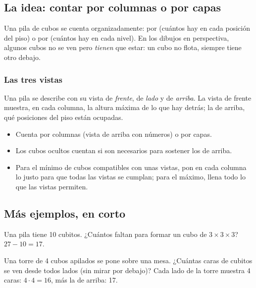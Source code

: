 \bitacora


\subsection{La idea: contar por columnas o por capas}
Una pila de cubos se cuenta organizadamente: por  (cuántos hay en cada posición del piso) o por
 (cuántos hay en cada nivel). En los dibujos en perspectiva, algunos cubos no se ven pero \emph{tienen} que
estar: un cubo no flota, siempre tiene otro debajo.


\subsubsection{Las tres vistas}
Una pila se describe con su vista de \emph{frente}, de \emph{lado} y de \emph{arriba}. La vista de frente muestra, en cada
columna, la altura máxima de lo que hay detrás; la de arriba, qué posiciones del piso están ocupadas.

\begin{regla}
\begin{itemize}
  \item Cuenta por columnas (vista de arriba con números) o por capas.
  \item Los cubos ocultos cuentan si son necesarios para sostener los de arriba.
  \item Para el mínimo de cubos compatibles con unas vistas, pon en cada columna lo justo para que todas las vistas se
  cumplan; para el máximo, llena todo lo que las vistas permiten.
\end{itemize}
\end{regla}

\subsection{Más ejemplos, en corto}
\begin{ejemplo}
Una pila tiene 10 cubitos. ¿Cuántos faltan para formar un cubo de $3 \times 3 \times 3$?
\solucion $27 - 10 = 17$.
\end{ejemplo}

\begin{ejemplo}
Una torre de 4 cubos apilados se pone sobre una mesa. ¿Cuántas caras de cubitos se ven desde todos lados (sin mirar por
debajo)?
\solucion Cada lado de la torre muestra 4 caras: $4 \cdot 4 = 16$, más la de arriba: 17.
\end{ejemplo}

